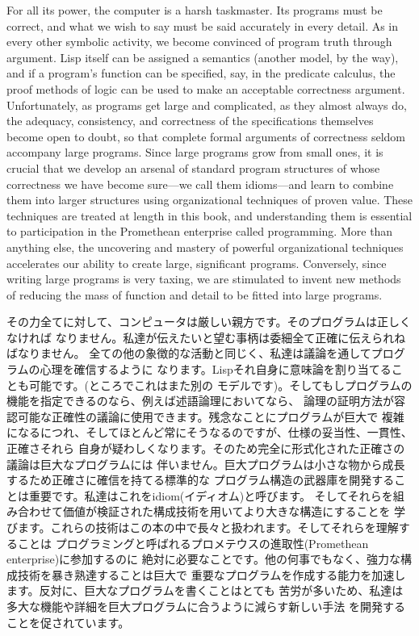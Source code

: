 \documentclass[oneside]{book}
\begin{document}
For all its power, the computer is a harsh taskmaster.  Its programs must be
correct, and what we wish to say must be said accurately in every detail.  As
in every other symbolic activity, we become convinced of program truth through
argument.  Lisp itself can be assigned a semantics (another model, by the way),
and if a program's function can be specified, say, in the predicate calculus,
the proof methods of logic can be used to make an acceptable correctness
argument.  Unfortunately, as programs get large and complicated, as they almost
always do, the adequacy, consistency, and correctness of the specifications
themselves become open to doubt, so that complete formal arguments of
correctness seldom accompany large programs.  Since large programs grow from
small ones, it is crucial that we develop an arsenal of standard program
structures of whose correctness we have become sure---we call them idioms---and
learn to combine them into larger structures using organizational techniques of
proven value.  These techniques are treated at length in this book, and
understanding them is essential to participation in the Promethean enterprise
called programming.  More than anything else, the uncovering and mastery of
powerful organizational techniques accelerates our ability to create large,
significant programs.  Conversely, since writing large programs is very taxing,
we are stimulated to invent new methods of reducing the mass of function and
detail to be fitted into large programs.

その力全てに対して、コンピュータは厳しい親方です。そのプログラムは正しくなければ
なりません。私達が伝えたいと望む事柄は委細全て正確に伝えられねばなりません。
全ての他の象徴的な活動と同じく、私達は議論を通してプログラムの心理を確信するように
なります。Lispそれ自身に意味論を割り当てることも可能です。(ところでこれはまた別の
モデルです)。そしてもしプログラムの機能を指定できるのなら、例えば述語論理においてなら、
論理の証明方法が容認可能な正確性の議論に使用できます。残念なことにプログラムが巨大で
複雑になるにつれ、そしてほとんど常にそうなるのですが、仕様の妥当性、一貫性、正確さそれら
自身が疑わしくなります。そのため完全に形式化された正確さの議論は巨大なプログラムには
伴いません。巨大プログラムは小さな物から成長するため正確さに確信を持てる標準的な
プログラム構造の武器庫を開発することは重要です。私達はこれをidiom(イディオム)と呼びます。
そしてそれらを組み合わせて価値が検証された構成技術を用いてより大きな構造にすることを
学びます。これらの技術はこの本の中で長々と扱われます。そしてそれらを理解することは
プログラミングと呼ばれるプロメテウスの進取性(Promethean enterprise)に参加するのに
絶対に必要なことです。他の何事でもなく、強力な構成技術を暴き熟達することは巨大で
重要なプログラムを作成する能力を加速します。反対に、巨大なプログラムを書くことはとても
苦労が多いため、私達は多大な機能や詳細を巨大プログラムに合うように減らす新しい手法
を開発することを促されています。
\end{document}
